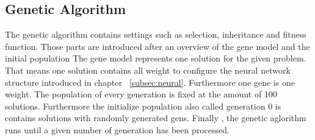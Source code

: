 \documentclass[a4paper]{article}
\begin{document}
\subsection{Genetic Algorithm}
The genetic algorithm contains settings such as selection, inheritance and fitness function. Those parts are introduced after an overview of the gene model and the initial population
The gene model represents one solution for the given problem. That means one solution contains all weight to configure the neural network structure introduced in chapter ~\ref{subsec:neural}. Furthermore one gene is one weight.
The population of every generation is fixed at the amount of 100 solutions. Furthermore the initialize population also called generation 0 is contains solutions with randomly generated gens.
Finally , the genetic aglorithm runs until a given number of generation has been processed.
\end{document}
